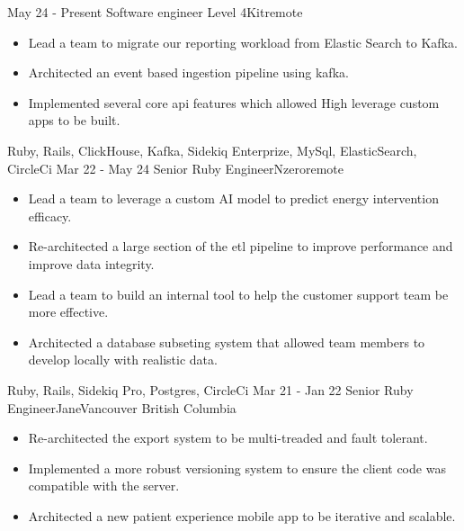 %
%
%

\begin{experiences}
  \experience
    {May 24 - Present}   {Software engineer Level 4}{Kit}{remote}
    {} {
        \begin{itemize}
          \item Lead a team to migrate our reporting workload from Elastic Search to Kafka.
          \item Architected an event based ingestion pipeline using kafka.
          \item Implemented several core api features which allowed High leverage custom apps to be built.
        \end{itemize}
      }
      {Ruby, Rails, ClickHouse, Kafka, Sidekiq Enterprize, MySql, ElasticSearch, CircleCi}
  \emptySeparator
  \experience
    {Mar 22 - May 24}   {Senior Ruby Engineer}{Nzero}{remote}
    {} {
        \begin{itemize}
          \item Lead a team to leverage a custom AI model to predict energy intervention efficacy.
          \item Re-architected a large section of the etl pipeline to improve performance and improve data integrity.
          \item Lead a team to build an internal tool to help the  customer support team be more effective.
          \item Architected a database subseting system that allowed team members to develop locally with realistic data.
        \end{itemize}
      }
      {Ruby, Rails, Sidekiq Pro, Postgres, CircleCi}
  \emptySeparator
  \experience
    {Mar 21 - Jan 22}   {Senior Ruby Engineer}{Jane}{Vancouver British Columbia}
    {} {
        \begin{itemize}
          \item Re-architected the export system to be multi-treaded and fault tolerant. 
          \item Implemented a more robust versioning system to ensure the client code was compatible with the server.
          \item Architected a new patient experience mobile app to be iterative and scalable.

\end{itemize}}
\end{experiences}
